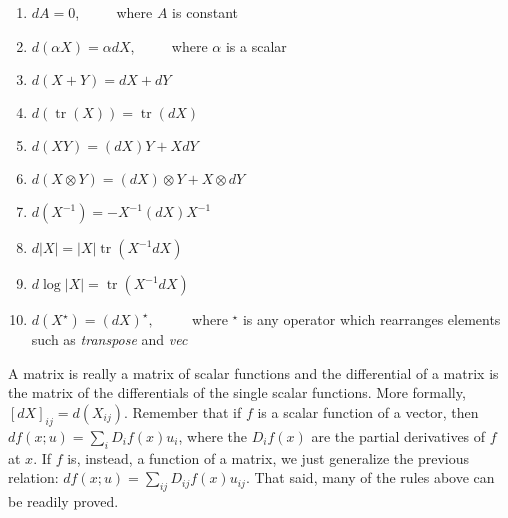 \documentclass[a4paper,12pt]{article}
\begin{document}
\begin{enumerate}
    \item $dA = 0$, $\qquad$ where $A$ is constant
    \item $d(\alpha X) = \alpha dX$, $\qquad$ where $\alpha$ is a scalar
    \item $d(X+Y) = dX + dY$
    \item $d(\operatorname{tr}(X)) = \operatorname{tr}(dX)$
    \item $d(XY) = (dX)Y + X dY$
    \item $d(X\otimes Y) = (dX)\otimes Y + X\otimes dY$
    \item $d(X^{-1}) = -X^{-1} (dX)X^{-1}$
    \item $d|X| = |X|\operatorname{tr}(X^{-1}dX)$
    \item $d\log|X| = \operatorname{tr}(X^{-1}dX)$
    \item \label{itm:diff_ten} $d(X^\star) = (dX)^\star,$ $\qquad$ where $^\star$ is any operator which rearranges elements such as \emph{transpose} and \emph{vec}
\end{enumerate}

A matrix is really a matrix of scalar functions and the differential of a matrix is the matrix of the differentials of the single scalar functions. More formally, $[dX]_{ij} = d(X_{ij})$. Remember that if $f$ is a scalar function of a vector, then $df(x;u) = \sum_i D_i f(x)u_i$, where the $D_i f(x)$ are the partial derivatives of $f$ at $x$. If $f$ is, instead, a function of a matrix, we just generalize the previous relation: $df(x;u) = \sum_{ij} D_{ij}f(x)u_{ij}$. That said, many of the rules above can be readily proved.
\end{document}
